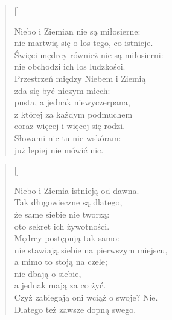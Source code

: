 \settowidth{\versewidth}{nie martwią się o los tego, co istnieje.}
\begin{verse}[\versewidth]

  Niebo i Ziemian nie są miłosierne: \\
  nie martwią się o los tego, co istnieje. \\
  Święci mędrcy również nie są miłosierni: \\
  nie obchodzi ich los ludzkości. \\
  Przestrzeń między Niebem i Ziemią \\
  zda się być niczym miech: \\
  pusta, a jednak niewyczerpana, \\
  z której za każdym podmuchem \\
  coraz więcej i więcej się rodzi. \\
  Słowami nic tu nie wskóram: \\
  już lepiej nie mówić nic.
\end{verse}

\settowidth{\versewidth}{Niebo i Ziemia istnieją od dawna.}
\begin{verse}[\versewidth]

  Niebo i Ziemia istnieją od dawna. \\
  Tak długowieczne są dlatego, \\
  że same siebie nie tworzą: \\
  oto sekret ich żywotności. \\
  Mędrcy postępują tak samo: \\
  nie stawiają siebie na pierwszym miejscu, \\
  a mimo to stoją na czele; \\
  nie dbają o siebie, \\
  a jednak mają za co żyć. \\
  Czyż zabiegają oni wciąż o swoje? Nie. \\
  Dlatego też zawsze dopną swego.
\end{verse}


